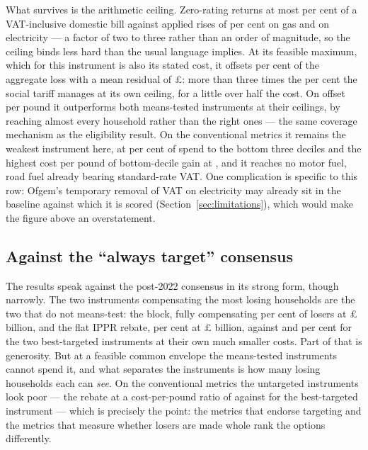 What survives is the arithmetic ceiling. Zero-rating returns at most \genVatCutMaxOffsetPct{} per cent of a VAT-inclusive domestic bill against applied rises of \genAppliedGasUnitRatePct{} per cent on gas and \genAppliedElecUnitRatePct{} on electricity --- a factor of two to three rather than an order of magnitude, so the ceiling binds less hard than the usual language implies. At its feasible maximum, which for this instrument is also its stated cost, it offsets \genVatCutEnvelopeOffsetPct{} per cent of the aggregate loss with a mean residual of \pounds \genVatCutEnvelopeResidualMeanGbp{}: more than three times the \genSocialTariffCappedOffsetPct{} per cent the social tariff manages at its own ceiling, for a little over half the cost. On offset per pound it outperforms both means-tested instruments at their ceilings, by reaching almost every household rather than the right ones --- the same coverage mechanism as the eligibility result. On the conventional metrics it remains the weakest instrument here, at \genVatCutShareBottomThree{} per cent of spend to the bottom three deciles and the highest cost per pound of bottom-decile gain at \genWorstCostPerPound{}, and it reaches no motor fuel, road fuel already bearing standard-rate VAT. One complication is specific to this row: Ofgem's temporary removal of VAT on electricity may already sit in the baseline against which it is scored (Section~\ref{sec:limitations}), which would make the figure above an overstatement.

\subsection{Against the ``always target'' consensus}

The results speak against the post-2022 consensus in its strong form, though narrowly. The two instruments compensating the most losing households are the two that do not means-test: the block, fully compensating \genJrfFullyCompensatedShare{} per cent of losers at \pounds\genJrfCostBn{} billion, and the flat IPPR rebate, \genRebateFullyCompensatedShare{} per cent at \pounds\genRebateCostBn{} billion, against \genSocialTariffFullyCompensatedShare{} and \genWhdFullyCompensatedShare{} per cent for the two best-targeted instruments at their own much smaller costs. Part of that is generosity. But at a feasible common envelope the means-tested instruments cannot spend it, and what separates the instruments is how many losing households each can \emph{see}. On the conventional metrics the untargeted instruments look poor --- the rebate at a cost-per-pound ratio of \genRebateCostPerPound{} against \genBestCostPerPound{} for the best-targeted instrument --- which is precisely the point: the metrics that endorse targeting and the metrics that measure whether losers are made whole rank the options differently.

